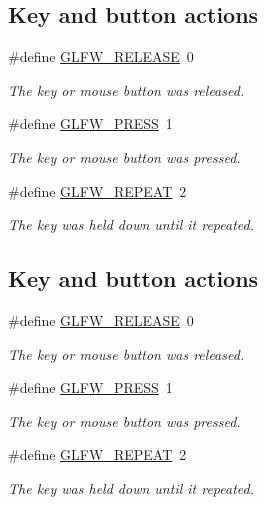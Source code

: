 \subsection*{Key and button actions}
\begin{DoxyCompactItemize}
\item 
\#define \hyperlink{group__input_gada11d965c4da13090ad336e030e4d11f}{G\+L\+F\+W\+\_\+\+R\+E\+L\+E\+A\+SE}~0
\begin{DoxyCompactList}\small\item\em The key or mouse button was released. \end{DoxyCompactList}\item 
\#define \hyperlink{group__input_ga2485743d0b59df3791c45951c4195265}{G\+L\+F\+W\+\_\+\+P\+R\+E\+SS}~1
\begin{DoxyCompactList}\small\item\em The key or mouse button was pressed. \end{DoxyCompactList}\item 
\#define \hyperlink{group__input_gac96fd3b9fc66c6f0eebaf6532595338f}{G\+L\+F\+W\+\_\+\+R\+E\+P\+E\+AT}~2
\begin{DoxyCompactList}\small\item\em The key was held down until it repeated. \end{DoxyCompactList}\end{DoxyCompactItemize}
\subsection*{Key and button actions}
\begin{DoxyCompactItemize}
\item 
\#define \hyperlink{group__input_gada11d965c4da13090ad336e030e4d11f}{G\+L\+F\+W\+\_\+\+R\+E\+L\+E\+A\+SE}~0
\begin{DoxyCompactList}\small\item\em The key or mouse button was released. \end{DoxyCompactList}\item 
\#define \hyperlink{group__input_ga2485743d0b59df3791c45951c4195265}{G\+L\+F\+W\+\_\+\+P\+R\+E\+SS}~1
\begin{DoxyCompactList}\small\item\em The key or mouse button was pressed. \end{DoxyCompactList}\item 
\#define \hyperlink{group__input_gac96fd3b9fc66c6f0eebaf6532595338f}{G\+L\+F\+W\+\_\+\+R\+E\+P\+E\+AT}~2
\begin{DoxyCompactList}\small\item\em The key was held down until it repeated. \end{DoxyCompactList}\end{DoxyCompactItemize}
